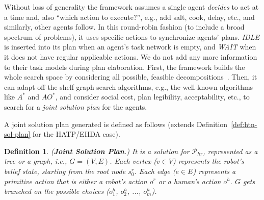 \documentclass[letterpaper]{article} %
\newtheorem{definition}{Definition}
\begin{document}
Without loss of generality the framework assumes a single agent \textit{decides} to act at a time and, also ``which action to execute?'', e.g., add salt, cook, delay, etc., and similarly, other agents follow. 
In this round-robin fashion (to include a broad spectrum of problems), it uses specific actions to synchronize agents' plans. \textit{IDLE} is inserted into its plan when an agent's task network is empty, and \textit{WAIT} when it does not have regular applicable actions.
We do not add any more information to their task models during plan elaboration. 
First, the framework builds the whole search space by considering all possible, feasible decompositions~\cite{buisan:hal-03684211}. 
Then, it can adapt off-the-shelf graph search algorithms, e.g., the well-known algorithms like $A^*$ and $AO^*$, and consider social cost, plan legibility, acceptability, etc., to search for a \textit{joint solution plan} for the agents. 

A joint solution plan generated is defined as follows (extends Definition~\ref{def:htn-sol-plan} for the HATP/EHDA case).
\begin{definition}
(\textbf{Joint Solution Plan}.) 
{It is a solution for $\mathcal{P}_{hr}$, represented as a tree or a graph, i.e., $G=(V,E)$. Each vertex ($v \in V$) represents the robot's belief state, starting from the root node $s_0^r$. Each edge ($e \in E$) represents a primitive action that is either a robot's action $o^{r}$ or a human's action $o^{h}$. $G$ gets branched on the possible choices ($o^{h}_1$, $o^{h}_2$, ..., $o^{h}_m$). 
}  
\end{definition}
\end{document}
